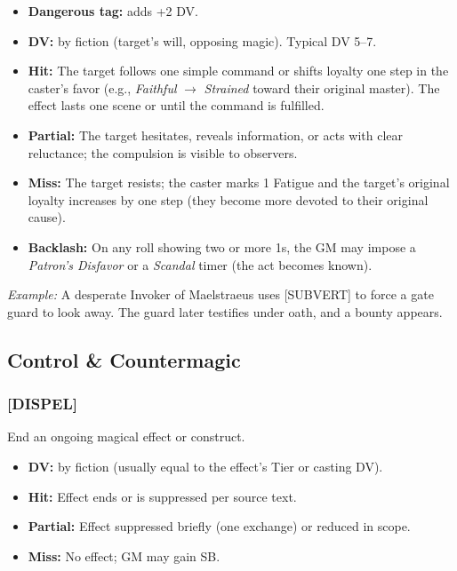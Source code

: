 \begin{itemize}
  \item \textbf{Dangerous tag:} adds +2 DV.
  \item \textbf{DV:} by fiction (target's will, opposing magic). Typical DV 5--7.
  \item \textbf{Hit:} The target follows one simple command or shifts loyalty one step in the caster's favor (e.g., \textit{Faithful} $\rightarrow$ \textit{Strained} toward their original master). The effect lasts one scene or until the command is fulfilled.
  \item \textbf{Partial:} The target hesitates, reveals information, or acts with clear reluctance; the compulsion is visible to observers.
  \item \textbf{Miss:} The target resists; the caster marks 1 Fatigue and the target's original loyalty increases by one step (they become more devoted to their original cause).
  \item \textbf{Backlash:} On any roll showing two or more 1s, the GM may impose a \textit{Patron's Disfavor} or a \textit{Scandal} timer (the act becomes known).
\end{itemize}

\textit{Example:} A desperate Invoker of Maelstraeus uses [SUBVERT] to force a gate guard to look away. The guard later testifies under oath, and a bounty appears.

\subsection{Control \& Countermagic}

\subsubsection{[DISPEL]}
End an ongoing magical effect or construct.
\begin{itemize}
  \item \textbf{DV:} by fiction (usually equal to the effect's Tier or casting DV).
  \item \textbf{Hit:} Effect ends or is suppressed per source text.
  \item \textbf{Partial:} Effect suppressed briefly (one exchange) or reduced in scope.
  \item \textbf{Miss:} No effect; GM may gain SB.
\end{itemize}

